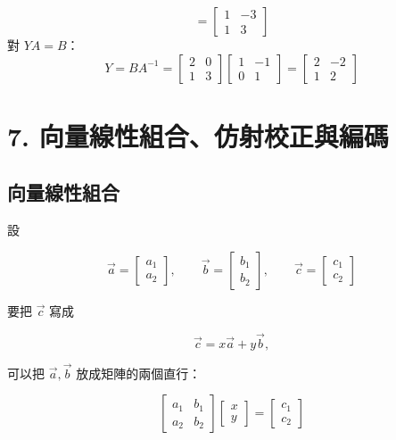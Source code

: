 \documentclass[11pt,a4paper]{article}
\begin{document}
\begin{enumerate}
\[  =\begin{bmatrix}1&-3\\1&3\end{bmatrix}
  \]
  對 \(YA=B\)：
  \[
  Y=BA^{-1}
  =\begin{bmatrix}2&0\\1&3\end{bmatrix}
  \begin{bmatrix}1&-1\\0&1\end{bmatrix}
  =\begin{bmatrix}2&-2\\1&2\end{bmatrix}
  \]
\end{enumerate}

\section{7. 向量線性組合、仿射校正與編碼}\label{ux5411ux91cfux7ddaux6027ux7d44ux5408ux4effux5c04ux6821ux6b63ux8207ux7de8ux78bc}

\subsection{向量線性組合}\label{ux5411ux91cfux7ddaux6027ux7d44ux5408}

設

\[
\vec a=\begin{bmatrix}a_1\\a_2\end{bmatrix},
\qquad
\vec b=\begin{bmatrix}b_1\\b_2\end{bmatrix},
\qquad
\vec c=\begin{bmatrix}c_1\\c_2\end{bmatrix}
\]

要把 \(\vec c\) 寫成

\[
\vec c=x\vec a+y\vec b,
\]

可以把 \(\vec a,\vec b\) 放成矩陣的兩個直行：

\[
\begin{bmatrix}a_1&b_1\\a_2&b_2\end{bmatrix}
\begin{bmatrix}x\\y\end{bmatrix}
=\begin{bmatrix}c_1\\c_2\end{bmatrix}
\]
\end{document}

